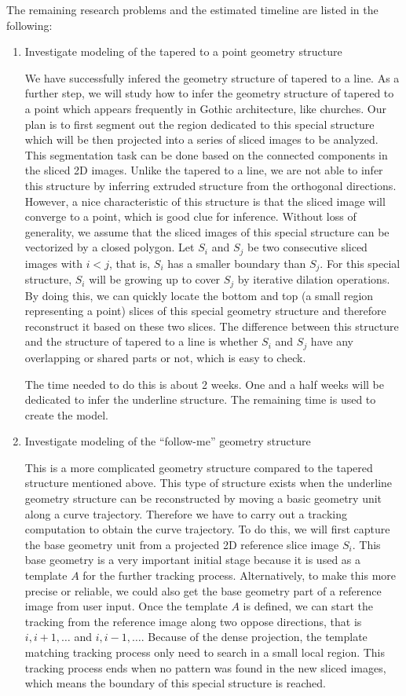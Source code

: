 \documentclass[12pt,letterpaper]{article}
\begin{document}
The remaining research problems and the estimated timeline are listed in the following:
\begin{enumerate}

\item Investigate modeling of the tapered to a point geometry structure

We have successfully infered the geometry structure of tapered to a line. As a further step, we will study
how to infer the geometry structure of tapered to a point which appears frequently in Gothic architecture,
like churches.
Our plan is to first segment out the region dedicated to this special structure which will
be then projected into a series of sliced images to be analyzed.
This segmentation task can be done based on the connected components in the sliced 2D images.
Unlike the tapered to a line, we are not able to infer this structure by inferring extruded
structure from the orthogonal directions.
However, a nice characteristic of this structure is that
the sliced image will converge to a point, which is good clue for inference.
Without loss of generality, we assume that the sliced images of this special structure
can be vectorized by a closed polygon.
Let $S_i$ and $S_j$ be two consecutive sliced images with $i < j$, that is, $S_i$
has a smaller boundary than $S_j$. For this special structure, $S_i$ will be growing up
to cover $S_j$ by iterative dilation operations. By doing this, we can quickly locate the
bottom and top (a small region representing a point) slices of this special geometry
structure and therefore reconstruct it based on these two slices.
The difference between this structure and the structure of tapered to a line is whether
$S_i$ and $S_j$ have any overlapping or shared parts or not, which is easy to check.

The time needed to do this is about 2 weeks.
One and a half weeks will be dedicated to infer the underline structure.
The remaining time is used to create the model.

\item Investigate modeling of the ``follow-me'' geometry structure

This is a more complicated geometry structure compared to the tapered structure mentioned above.
This type of structure exists when the underline geometry structure can be reconstructed by
moving a basic geometry unit along a curve trajectory.
Therefore we have to carry out a tracking computation to obtain the curve trajectory.
To do this, we will first capture the base geometry unit from a projected 2D reference slice image $S_i$.
This base geometry is a very important initial stage because it is used as a template $A$
for the further tracking process.
Alternatively, to make this more precise or reliable, we could also get the base geometry part
of a reference image from user input.
Once the template $A$ is defined, we can start the tracking from the reference image along
two oppose directions, that is $i, i+1, \ldots$ and $i, i-1, \ldots$.
Because of the dense projection, the template matching tracking process only need to search
in a small local region.
This tracking process ends when no pattern was found in the new sliced images, which means the
boundary of this special structure is reached.


\end{enumerate}
\end{document}
